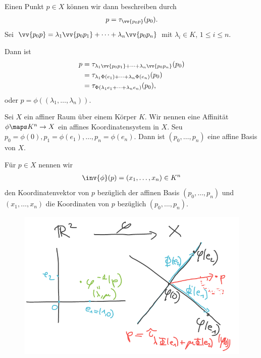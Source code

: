 Einen Punkt \( p\in X \) können wir dann beschreiben durch
\begin{align*}
    p=\tau_{\vv{p_0 p}}(p_0).
\end{align*}
Sei \( \vv{p_0 p}=\lambda_1 \vv{p_0 p_1}+\dotsb +\lambda_n \vv{p_0 p_n} \) mit \( \lambda_i\in K \), \( 1\leq i \leq n \).

Dann ist
\begin{align*}
    p \begin{aligned}[t]
        &=\tau_{\lambda_1\vv{p_0 p_1}+\dotsb +\lambda_n\vv{p_0 p_n}}(p_0)\\
        &=\tau_{\lambda_1 \Phi(e_1)+\dotsb+\lambda_n \Phi(e_n)}(p_0)\\
        &=\tau_{\Phi(\lambda_1 e_1+\dotsb+\lambda_n e_n)}(p_0),
    \end{aligned}
\end{align*}
oder \( p=\phi((\lambda_1,\dotsc,\lambda_n)) \).

\begin{definition*}
    Sei \( X \) ein affiner Raum über einem Körper \( K \). Wir nennen eine Affinität \( \phi\maps K^n\to X \) ein affines Koordinatensystem in \( X \). Seu \( p_0=\phi(0),p_1=\phi(e_1),\dotsc, p_n=\phi(e_n) \). Dann ist \( (p_0,\dotsc,p_n) \) eine affine Basis von \( X \).

    Für \( p\in X \) nennen wir
    \begin{align*}
        \inv{\phi}(p)=(x_1,\dotsc,x_n)\in K^n
    \end{align*}
    den Koordinatenvektor von \( p \) bezüglich der affinen Basis \( (p_0,\dotsc,p_n) \) und \( (x_1,\dotsc, x_n) \) die Koordinaten von \( p \) bezüglich \( (p_0,\dotsc, p_n) \). 
    \begin{figure}[H]
        \centering
        \includegraphics[width=0.7\linewidth]{figures/affine_koordinatenabbildung_r_2}
        \label{fig:affine_koordinatenabbildung_r_2}
    \end{figure}
\end{definition*}
